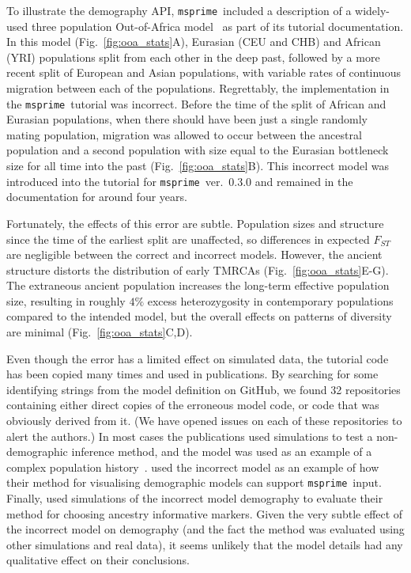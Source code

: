 \documentclass{article}
\newcommand{\msprime}[0]{\texttt{msprime}}
\begin{document}
To illustrate the demography API, \msprime\ included a description of a widely-used
three population Out-of-Africa model~\citep{gutenkunst2009inferring}
as part of its tutorial documentation. In this model (Fig.~\ref{fig:ooa_stats}A),
Eurasian (CEU and CHB) and African (YRI) populations split from each other in the deep past,
followed by a more recent split of European and Asian populations, with variable rates of
continuous migration between each of the populations. Regrettably, the implementation in the
\msprime\ tutorial was incorrect. Before the time of the split of African and Eurasian
populations, when there should have been just a single randomly mating population, migration was
allowed to occur between the ancestral population and a second population with size equal to
the Eurasian bottleneck size for all time into the past
(Fig.~\ref{fig:ooa_stats}B). This incorrect model was introduced into
the tutorial for \msprime~ver.~0.3.0 and remained in the documentation for
around four years.

Fortunately, the effects of this error are subtle.
Population sizes and structure since the time of
the earliest split are unaffected, so differences in expected $F_{ST}$ are negligible between
the correct and incorrect models. However, the ancient structure distorts the distribution
of early TMRCAs (Fig.~\ref{fig:ooa_stats}E-G).
The extraneous ancient population increases the long-term effective
population size, resulting in roughly $4\%$ excess heterozygosity in
contemporary populations compared to the intended model, but the overall effects
on patterns of diversity are minimal (Fig.~\ref{fig:ooa_stats}C,D).

Even though the error has a limited effect on simulated data, the tutorial code has been
copied many times and used in publications. By searching for some identifying strings
from the model definition on GitHub,
we found 32 repositories containing either direct copies of the
erroneous model code, or code that was obviously derived from it.
(We have opened issues on each of these repositories to alert the authors.)
In most cases the publications used simulations to test a non-demographic inference
method, and the model was used as an example of a complex population
history~\citep{kelleher2019inferring,albers2020dating,tong2020population}.
\cite{zhou2018popdemog} used the incorrect model as an example
of how their method for visualising demographic models can support
\msprime\ input.
Finally, \cite{pfaffelhuber2020choose}
used simulations of the incorrect model demography to evaluate
their method for choosing ancestry informative markers.
Given the very subtle effect of the incorrect
model on demography (and the fact the method was evaluated using other
simulations and real data), it seems unlikely that the model details
had any qualitative effect on their conclusions.
\end{document}
